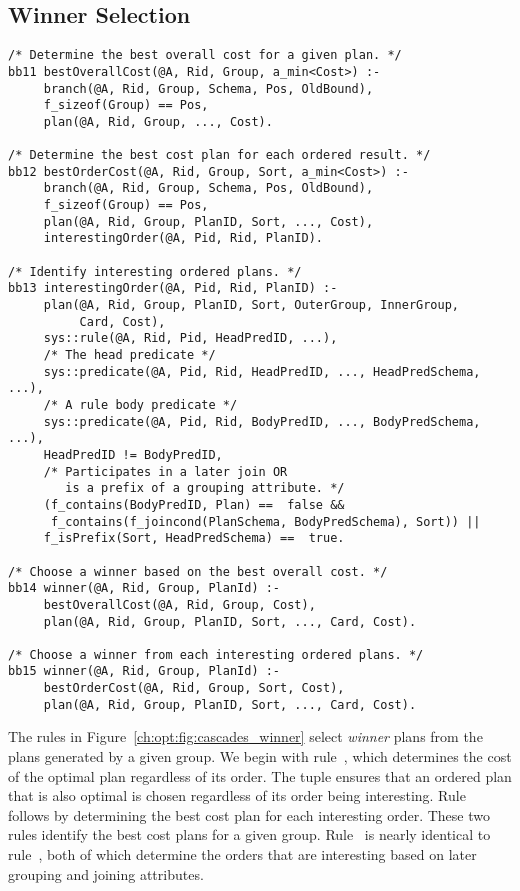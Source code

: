 \subsection{Winner Selection}
\label{ch:opt:sec:cascades_winner}

\begin{figure*}
\ssp
\centering
\begin{lstlisting}
/* Determine the best overall cost for a given plan. */
bb11 bestOverallCost(@A, Rid, Group, a_min<Cost>) :-
     branch(@A, Rid, Group, Schema, Pos, OldBound),
     f_sizeof(Group) == Pos,
     plan(@A, Rid, Group, ..., Cost).

/* Determine the best cost plan for each ordered result. */
bb12 bestOrderCost(@A, Rid, Group, Sort, a_min<Cost>) :-
     branch(@A, Rid, Group, Schema, Pos, OldBound),
     f_sizeof(Group) == Pos,
     plan(@A, Rid, Group, PlanID, Sort, ..., Cost),
     interestingOrder(@A, Pid, Rid, PlanID).

/* Identify interesting ordered plans. */ 
bb13 interestingOrder(@A, Pid, Rid, PlanID) :-
     plan(@A, Rid, Group, PlanID, Sort, OuterGroup, InnerGroup, 
          Card, Cost),
     sys::rule(@A, Rid, Pid, HeadPredID, ...),
     /* The head predicate */
     sys::predicate(@A, Pid, Rid, HeadPredID, ..., HeadPredSchema, ...),
     /* A rule body predicate */
     sys::predicate(@A, Pid, Rid, BodyPredID, ..., BodyPredSchema, ...),
     HeadPredID != BodyPredID, 
     /* Participates in a later join OR 
        is a prefix of a grouping attribute. */
     (f_contains(BodyPredID, Plan) ==  false &&
      f_contains(f_joincond(PlanSchema, BodyPredSchema), Sort)) ||
     f_isPrefix(Sort, HeadPredSchema) ==  true.

/* Choose a winner based on the best overall cost. */
bb14 winner(@A, Rid, Group, PlanId) :-
     bestOverallCost(@A, Rid, Group, Cost),
     plan(@A, Rid, Group, PlanID, Sort, ..., Card, Cost).

/* Choose a winner from each interesting ordered plans. */
bb15 winner(@A, Rid, Group, PlanId) :-
     bestOrderCost(@A, Rid, Group, Sort, Cost),
     plan(@A, Rid, Group, PlanID, Sort, ..., Card, Cost).
\end{lstlisting}
\caption{\label{ch:opt:fig:cascades_winner} Cascades winner selection rules.}
\end{figure*}

The rules in Figure~\ref{ch:opt:fig:cascades_winner} select {\em winner} plans
from the plans generated by a given group.  We begin with rule~, which
determines the cost of the optimal plan regardless of its order.  The
 tuple ensures that an ordered plan that is also optimal is
chosen regardless of its order being interesting.  Rule~ follows by
determining the best cost plan for each interesting order.  These two rules
identify the best cost plans for a given group.  Rule~ is nearly
identical to rule~, both of which determine the orders that are
interesting based on later grouping and joining attributes.

